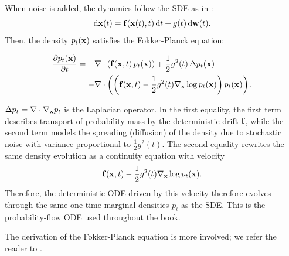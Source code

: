 When noise is added, the dynamics follow the SDE as in :
\[
\mathop{}\!\mathrm{d} {\mathbf{x}}(t) = {\mathbf{f}}({\mathbf{x}}(t), t)\mathop{}\!\mathrm{d} t + g(t)\mathop{}\!\mathrm{d} {\mathbf{w}}(t).
\]
Then, the density $ p_t({\mathbf{x}}) $ satisfies the Fokker-Planck equation:
\begin{mdframed}
    \begin{align*}
    \frac{\partial p_t({\mathbf{x}})}{\partial t}
&= - \nabla \cdot \left( {\mathbf{f}}({\mathbf{x}}, t)\, p_t({\mathbf{x}}) \right)
+ \frac{1}{2} g^2(t)\, \Delta p_t({\mathbf{x}})
\\& = - \nabla \cdot \left(  \left({{\mathbf{f}}({\mathbf{x}}, t)}-{\frac{1}{2} g^2(t) \nabla_{\mathbf{x}} \log p_t({\mathbf{x}})}\right) p_t({\mathbf{x}})\right).
\end{align*}
\end{mdframed}
$ \Delta p_t = \nabla \cdot \nabla_{\mathbf{x}} p_t $ is the Laplacian operator. In the first equality, the first term describes transport of probability mass by the deterministic drift ${\mathbf{f}}$, while the second term models the spreading (diffusion) of the density due to stochastic noise with variance proportional to $\tfrac{1}{2} g^2(t) $. The second equality rewrites the same density evolution as a continuity
equation with velocity
\[
{\mathbf{f}}({\mathbf{x}},t)
-
\frac{1}{2}g^2(t)\nabla_{{\mathbf{x}}}\log p_t({\mathbf{x}}).
\]
Therefore, the deterministic ODE driven by this
velocity therefore evolves through the same one-time marginal densities
$p_t$ as the SDE. This is the probability-flow ODE used throughout
the book.




The derivation of the Fokker-Planck equation is more involved; we refer the reader to .







